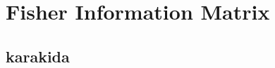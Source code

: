 \documentclass[]{article}
\title{}
\author{}
\begin{document}
\maketitle


\section{Fisher Information Matrix}
\subsection{karakida}
\end{document}
